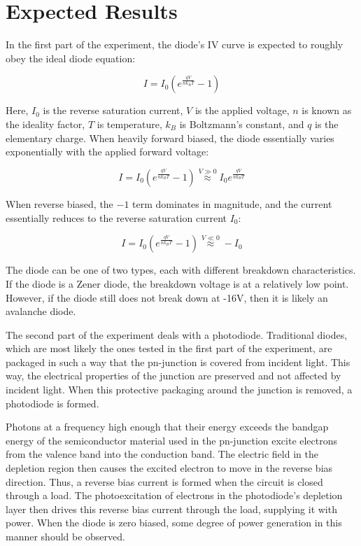 \documentclass{article}
\begin{document}
\section{Expected Results}
\scriptsize{
In the first part of the experiment, the diode's IV curve is expected to roughly obey the ideal diode equation:

\begin{equation}
	\label{eq:ideal_diode}
	I = I_{0} (e^{\frac{qV}{nk_{B}T}} - 1)
\end{equation}

Here, $I_{0}$ is the reverse saturation current, $V$ is the applied voltage, $n$ is known as the ideality factor, $T$ is temperature, $k_{B}$ is Boltzmann's constant, and $q$ is the elementary charge. When heavily forward biased, the diode essentially varies exponentially with the applied forward voltage:

\begin{equation}
	\label{eq:fwd_bias_approx}
	I = I_{0} (e^{\frac{qV}{nk_{B}T}} - 1) \stackrel{V \gg 0}{\approx} I_{0} e^{\frac{qV}{nk_{B}T}}
\end{equation}

When reverse biased, the $-1$ term dominates in magnitude, and the current essentially reduces to the reverse saturation current $I_{0}$:

\begin{equation}
	\label{eq:rev_bias_approx}
	I = I_{0} (e^{\frac{qV}{nk_{B}T}} - 1) \stackrel{V \ll 0}{\approx} -I_{0}
\end{equation}

The diode can be one of two types, each with different breakdown characteristics. If the diode is a Zener diode, the breakdown voltage is at a relatively low point. However, if the diode still does not break down at -16V, then it is likely an avalanche diode.

The second part of the experiment deals with a photodiode. Traditional diodes, which are most likely the ones tested in the first part of the experiment, are packaged in such a way that the pn-junction is covered from incident light. This way, the electrical properties of the junction are preserved and not affected by incident light. When this protective packaging around the junction is removed, a photodiode is formed.

Photons at a frequency high enough that their energy exceeds the bandgap energy of the semiconductor material used in the pn-junction excite electrons from the valence band into the conduction band. The electric field in the depletion region then causes the excited electron to move in the reverse bias direction. Thus, a reverse bias current is formed when the circuit is closed through a load. The photoexcitation of electrons in the photodiode's depletion layer then drives this reverse bias current through the load, supplying it with power. When the diode is zero biased, some degree of power generation in this manner should be observed.

}
\end{document}
